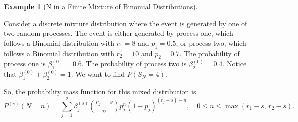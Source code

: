 \documentclass[11pt]{amsart}
\theoremstyle{definition}
\newtheorem{example}{Example}
\theoremstyle{plain}
\begin{document}
\begin{example}[N in a Finite Mixture of Binomial Distributions]\label{ex:binom-mix}
Consider a discrete mixture distribution where the event is generated by one of two random
processes.  The event is either generated by process one, which follows a Binomial
distribution with $r_1 = 8$ and $p_1 = 0.5$, or process two, which follows a Binomial
distribution with $r_2 = 10$ and $p_2 = 0.7$.  The probability of process one is
$\beta_1^{(0)} = 0.6$.  The probability of process two is $\beta_2^{(0)} = 0.4$.  Notice
that $\beta_1^{(0)} + \beta_2^{(0)} = 1$.  We want to find $P(S_N = 4)$.

So, the probability mass function for this mixed distribution is
\[
    P^{(s)}(N = n)
    = \sum_{j=1}^{2}\beta_j^{(s)}
      \binom{r_j - s}{n} p_j^n(1-p_j)^{(r_j - s) - n},
    \quad 0 \leq n \leq \max(r_1 - s,\, r_2 - s).
\]


\end{example}
\end{document}
